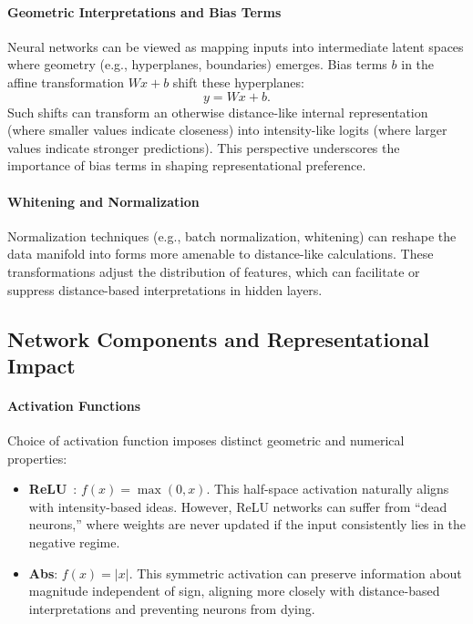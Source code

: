 \paragraph{Geometric Interpretations and Bias Terms}
Neural networks can be viewed as mapping inputs into intermediate latent spaces where geometry (e.g., hyperplanes, boundaries) emerges. Bias terms $b$ in the affine transformation $Wx + b$ shift these hyperplanes:
\begin{equation}
    y = Wx + b.
\end{equation}
Such shifts can transform an otherwise distance-like internal representation (where smaller values indicate closeness) into intensity-like logits (where larger values indicate stronger predictions). This perspective underscores the importance of bias terms in shaping representational preference.

\paragraph{Whitening and Normalization}
Normalization techniques (e.g., batch normalization, whitening) can reshape the data manifold into forms more amenable to distance-like calculations. These transformations adjust the distribution of features, which can facilitate or suppress distance-based interpretations in hidden layers.

\subsection{Network Components and Representational Impact}

\paragraph{Activation Functions}
Choice of activation function imposes distinct geometric and numerical properties:
\begin{itemize}
    \item \textbf{ReLU}~: $f(x) = \max(0, x)$. This half-space activation naturally aligns with intensity-based ideas. However, ReLU networks can suffer from ``dead neurons,'' where weights are never updated if the input consistently lies in the negative regime.
    \item \textbf{Abs}: $f(x) = |x|$. This symmetric activation can preserve information about magnitude independent of sign, aligning more closely with distance-based interpretations and preventing neurons from dying.
\end{itemize}

